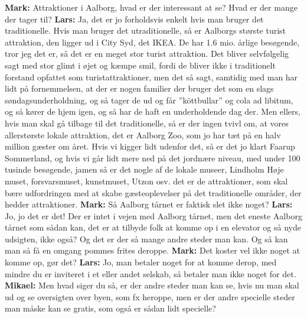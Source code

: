 \textbf{Mark:} Attraktioner i Aalborg, hvad er der interessant at se? Hvad er der mange der tager til? \newline
\textbf{Lars:} Ja, det er jo forholdsvis enkelt hvis man bruger det traditionelle. Hvis man bruger det utraditionelle, så er Aalborgs største turist attraktion, den ligger ud i City Syd, det IKEA. De har 1.6 mio. årlige besøgende, tror jeg det er, så det er en meget stor turist attraktion. Det bliver selvfølgelig sagt med stor glimt i øjet og kæmpe smil, fordi de bliver ikke i traditionelt forstand opfattet som turistattraktioner, men det så sagt, samtidig med man har lidt på fornemmelsen, at der er nogen familier der bruger det som en slags søndagsunderholdning, og så tager de ud og får ”köttbullar” og cola ad libitum, og så kører de hjem igen, og så har de haft en underholdende dag der. Men ellers, hvis man skal gå tilbage til det traditionelle, så er der ingen tvivl om, at vores allerstørste lokale attraktion, det er Aalborg Zoo, som jo har tæt på en halv million gæster om året. Hvis vi kigger lidt udenfor det, så er det jo klart Faarup Sommerland, og hvis vi går lidt mere ned på det jordnære niveau, med under 100 tusinde besøgende, jamen så er det nogle af de lokale museer, Lindholm Høje muset, forsvarsmuset, kunstmuset, Utzon osv. det er de attraktioner, som skal bære udfordringen  med at skabe gæsteoplevelser på det traditionelle områder, der hedder attraktioner. \newline
\textbf{Mark:} Så Aalborg tårnet er faktisk slet ikke noget? \newline
\textbf{Lars:} Jo, jo det er det! Der er intet i vejen med Aalborg tårnet, men det eneste Aalborg tårnet som sådan kan, det er at tilbyde folk at komme op i en elevator og så nyde udsigten, ikke også? Og det er der så mange andre steder man kan. Og så kan man så få en omgang pommes frites deroppe. \newline
\textbf{Mark:} Det koster vel ikke noget at komme op, gør det? \newline
\textbf{Lars:} Jo, man betaler noget for at komme derop, med mindre du er inviteret i et eller andet selskab, så betaler man ikke noget for det. \newline
\textbf{Mikael:} Men hvad siger du så, er der andre steder man kan se, hvis nu man skal ud og se oversigten over byen, som fx heroppe, men er der andre specielle steder man måske kan se gratis, som også er sådan lidt specielle? \newline
